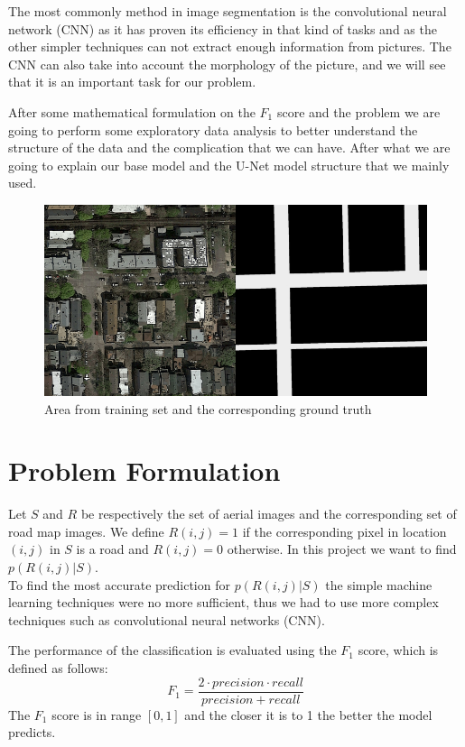 \documentclass[10pt,conference,compsocconf]{IEEEtran}
\begin{document}
The most commonly method in image segmentation is the convolutional neural network (CNN) as it has proven its efficiency in that kind of tasks and as the other simpler techniques can not extract enough information from pictures. The CNN can also take into account the morphology of the picture, and we will see that it is an important task for our problem.

After some mathematical formulation on the $F_1$ score and the problem we are going to perform some exploratory data analysis to better understand the structure of the data and the complication that we can have. After what we are going to explain our base model and the U-Net model structure that we mainly used.

\begin{figure}
    \centering
    \includegraphics[scale=0.30]{combined.jpg}
    \caption{Area from training set and the corresponding ground truth}
    \label{fig:overlay}
\end{figure}

\section{Problem Formulation}
Let $S$ and $R$ be respectively the set of aerial images and the corresponding set of road map images. We define $R(i,j)=1$ if the corresponding pixel in location $(i,j)$ in $S$ is a road and $R(i,j)=0$ otherwise. In this project we want to find $p(R(i,j)|S)$.\\

To find the most accurate prediction for $p(R(i,j)|S)$ the simple machine learning techniques were no more sufficient, thus we had to use more complex techniques such as convolutional neural networks (CNN).

The performance of the classification is evaluated using the $F_1$ score, which is defined as follows:
$$ F_1=\frac{2\cdot precision \cdot recall}{precision + recall}$$
The $F_1$ score is in range $[0,1]$ and the closer it is to 1 the better the model predicts.
\end{document}
